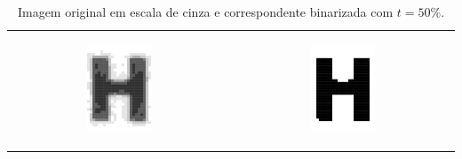 \documentclass[a4paper,11pt]{article}
\begin{document}
    
    \begin{table}[ht]
      \begin{center}
        \caption{Imagem original em escala de cinza e correspondente binarizada com $t = 50\%.$}
        \begin{tabular}{ c c }
            \includegraphics[width=0.3\textwidth]{assets/binarization/h_3grayscale_big.png}
            \label{fig:letrah}
            &
            \includegraphics[width=0.3\textwidth]{assets/binarization/bin_big.png}
            
            \label{fig:letrah_bin}
        \end{tabular}
      \end{center}
    \end{table}
\end{document}
